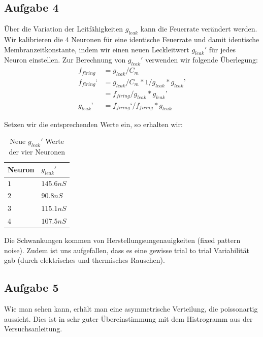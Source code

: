\documentclass[10pt,a4paper]{scrartcl}
\begin{document}
\newpage


\subsection{Aufgabe 4}
Über die Variation der Leitfähigkeiten $g_{leak}$ kann die Feuerrate verändert werden. Wir kalibrieren die 4 Neuronen für eine identische Feuerrate und damit identische Membranzeitkonstante, indem wir einen neuen Leckleitwert $g_{leak}'$ für jedes Neuron einstellen. Zur Berechnung von $g_{leak}'$ verwenden wir folgende Überlegung:
\begin{align*}
f_{firing}&=g_{leak}/C_m\\f_{firing}‘&=g_{leak}/C_m*1/g_{leak}*g_{leak}’\\&=f_{firing}/g_{leak}*g_{leak}’\\g_{leak}’&=f_{firing}‘/f_{firing}*g_{leak}
\end{align*}

\noindent Setzen wir die entsprechenden Werte ein, so erhalten wir:

\begin{table}[H]
\centering
\captionsetup{justification=centering}
\caption{Neue $g_{leak}'$ Werte der vier Neuronen}
\begin{tabular}{l|l}
 Neuron&$g_{leak}'$\\
\hline
$1$&$145.6 nS$\\
$2$&$90.8 nS$\\
$3$&$115.1 nS$\\
$4$&$107.5 nS$
\end{tabular}
\label{tab:01}
\end{table}

\noindent Die Schwankungen kommen von Herstellungsungenauigkeiten (fixed pattern noise). Zudem ist uns aufgefallen, dass es eine gewisse trial to trial Variabilität gab (durch elektrisches und thermisches Rauschen). 


\subsection{Aufgabe 5}
Wie man sehen kann, erhält man eine asymmetrische Verteilung, die poissonartig aussieht. Dies ist in sehr guter Übereinstimmung mit dem Histrogramm aus der Versuchsanleitung.
\end{document}
